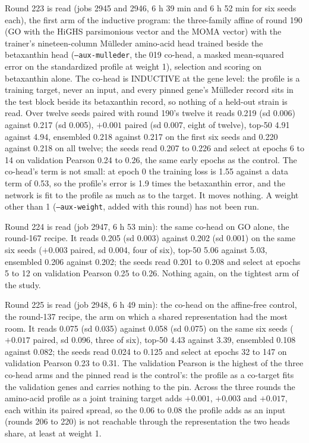 Round 223 is read (jobs 2945 and 2946, 6 h 39 min and 6 h 52 min for six seeds each),
the first arm of the inductive program: the three-family affine of round 190 (GO with
the HiGHS parsimonious vector and the MOMA vector) with the trainer's nineteen-column
M\"ulleder amino-acid head trained beside the betaxanthin head
(\texttt{--aux-mulleder}, the 019 co-head, a masked mean-squared error on the
standardized profile at weight 1), selection and scoring on betaxanthin alone. The
co-head is INDUCTIVE at the gene level: the profile is a training target, never an
input, and every pinned gene's M\"ulleder record sits in the test block beside its
betaxanthin record, so nothing of a held-out strain is read. Over twelve seeds paired
with round 190's twelve it reads 0.219 (sd 0.006) against 0.217 (sd 0.005), $+0.001$
paired (sd 0.007, eight of twelve), top-50 4.91 against 4.94, ensembled 0.218 against
0.217 on the first six seeds and 0.220 against 0.218 on all twelve; the seeds read
0.207 to 0.226 and select at epochs 6 to 14 on validation Pearson 0.24 to 0.26, the
same early epochs as the control. The co-head's term is not small: at epoch 0 the
training loss is 1.55 against a data term of 0.53, so the profile's error is 1.9 times
the betaxanthin error, and the network is fit to the profile as much as to the target.
It moves nothing. A weight other than 1 (\texttt{--aux-weight}, added with this round)
has not been run.

Round 224 is read (job 2947, 6 h 53 min): the same co-head on GO alone, the round-167
recipe. It reads 0.205 (sd 0.003) against 0.202 (sd 0.001) on the same six seeds
($+0.003$ paired, sd 0.004, four of six), top-50 5.06 against 5.03, ensembled 0.206
against 0.202; the seeds read 0.201 to 0.208 and select at epochs 5 to 12 on validation
Pearson 0.25 to 0.26. Nothing again, on the tightest arm of the study.

Round 225 is read (job 2948, 6 h 49 min): the co-head on the affine-free control, the
round-137 recipe, the arm on which a shared representation had the most room. It reads
0.075 (sd 0.035) against 0.058 (sd 0.075) on the same six seeds ($+0.017$ paired, sd
0.096, three of six), top-50 4.43 against 3.39, ensembled 0.108 against 0.082; the seeds
read 0.024 to 0.125 and select at epochs 32 to 147 on validation Pearson 0.23 to 0.31.
The validation Pearson is the highest of the three co-head arms and the pinned read is
the control's: the profile as a co-target fits the validation genes and carries nothing
to the pin. Across the three rounds the amino-acid profile as a joint training target
adds $+0.001$, $+0.003$ and $+0.017$, each within its paired spread, so the 0.06 to
0.08 the profile adds as an input (rounds 206 to 220) is not reachable through the
representation the two heads share, at least at weight 1.

